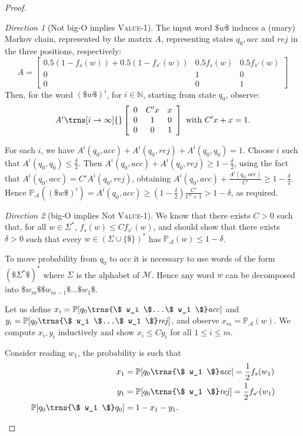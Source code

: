 \documentclass[10pt,a4paper]{amsart}
\numberwithin{equation}{section}
\theoremstyle{plain}
\theoremstyle{definition}
\theoremstyle{remark}
\newtheorem{dir}{Direction}
\newcommand\acc{\mathit{acc}}
\newcommand\rej{\mathit{rej}}
\newcommand\lmc{\mathcal{M}}
\newcommand\pr{\mathbb{P}}
\newcommand\pa{\mathcal{A}}
\renewcommand\nu{f}
\begin{document}
\begin{proof}
\begin{dir}[Not big-O implies \textsc{Value-1}]
The input word $\$w\$$ induces a (unary) Markov chain, represented by the matrix $A$, representing states $q_0, \acc$ and $\rej$ in the three positions, respectively:\[A = \left[
\begin{array}{ccccc}
0.5(1-\nu_s(w)) + 0.5(1-\nu_{s'}(w))  & 0.5\nu_s(w) & 0.5\nu_{s'}(w) \\
0 & 1 & 0 \\
0 & 0 & 1
\end{array}
\right]
\]
Then, for the word $(\$w\$)^i$, for $i \in \mathbb{N}$, starting from state $q_0$, observe:
\[
A^i
\trns[i\to\infty]{}
\left[\begin{array}{ccccc}
0 & C' x & x \\
0 & 1 & 0 \\
0 & 0 & 1 \\
\end{array}\right] \text{ with } C'x + x = 1.
\]

For each $i$, we have $A^i(q_0,\acc) +A^i(q_0,\rej) +A^i(q_0,q_0)= 1 $. Choose $i$ such that $A^i(q_0,q_0) \le \frac{\delta}{2}$. Then $A^i(q_0,\acc) +A^i(q_0,\rej) \ge 1 -\frac{\delta}{2} $, using the fact that  $A^i(q_0,\acc) = C' A^i(q_0,\rej)$,  obtaining $A^i(q_0,\acc) +\frac{A^i(q_0,\acc)}{C'} \ge 1 - \frac{\delta}{2}$. Hence $\pr_\pa((\$w\$)^i) = A^i(q_0,\acc) \ge (1 - \frac{\delta}{2})\frac{C'}{C'+1} > 1-\delta $, as required.
\end{dir}

\begin{dir}[big-O implies Not \textsc{Value-1}]

We know that there exists $C > 0$ such that, for all $w \in \Sigma^*$, $\nu_s(w) \le C \nu_{s'}(w)$, and should show that there exists $\delta > 0 $ such that every $w \in (\Sigma \cup\{\$\})^*$ has $\pr_\pa(w) \le 1-\delta$.

To move probability from $q_0$ to $\acc$ it is necessary to use words of the form $(\$ \Sigma^* \$)^*$ where $\Sigma$ is the alphabet of $\lmc$. Hence any word $w$ can be decomposed into $\$ w_m \$\$ w_{m-1} \$...\$ w_1 \$$.

Let us define $x_i = \pr[q_0 \trns{\$ w_i \$...\$ w_1 \$} \acc]$ and $y_i = \pr[q_0 \trns{\$ w_i \$...\$ w_1 \$} \rej]$, and observe $x_m =  \pr_\pa(w)$. We compute $x_i,y_i$ inductively and show $x_i\le C y_i$ for all $1\le i\le m$.

Consider reading $w_1$, the probability is such that
\begin{align*}x_1 &= \pr[q_0 \trns{\$ w_1 \$} \acc] =\frac{1}{2} \nu_s(w_1) \\ y_1 &= \pr[q_0 \trns{\$ w_1 \$} \rej] =\frac{1}{2} \nu_{s'}(w_1) \\ \pr[q_0 \trns{\$ w_1 \$} q_0]  &= 1-x_1-y_1.\end{align*}


\end{dir}
\end{proof}
\end{document}

